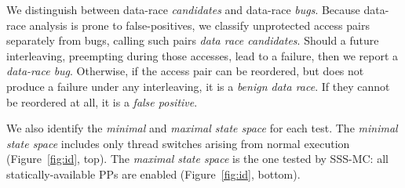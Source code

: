 We distinguish between data-race {\em candidates} and data-race {\em bugs}.
Because data-race analysis is prone to false-positives,
we classify unprotected access pairs separately from bugs,
calling such pairs {\em data race candidates}.
Should a future interleaving, preempting during those accesses,
lead to a failure, then we report a {\em data-race bug}.
Otherwise, if the access pair can be reordered, but does not produce a failure under any interleaving, it is a {\em benign data race}.
If they cannot be reordered at all, it is a {\em false positive}.

We also identify the {\em minimal} and {\em maximal state space} for each test.
The {\em minimal state space} includes only thread switches arising from normal execution (Figure~\ref{fig:id}, top).
The {\em maximal state space} is the one tested by SSS-MC: all statically-available PPs are enabled (Figure~\ref{fig:id}, bottom).
